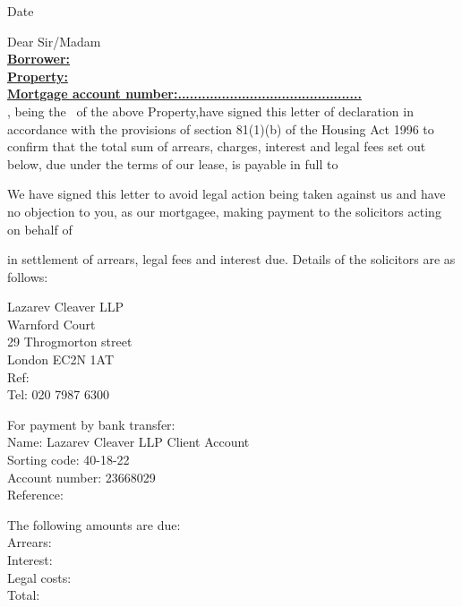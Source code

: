\documentclass{article}
\begin{document}
\noindent{\addressee} \\
\street\\
\locality\\
\town\\
\postcode\\

\noindent Date \dateset\par
\vspace{5 mm}
\noindent Dear Sir/Madam\\
\textbf{\underline{Borrower: \borrower}}\\
\noindent\textbf{\underline{Property: \property}}
\vspace{2 mm}\\
\textbf{\underline{Mortgage account number:..............................................}}\\
\weborrower, being the \lessees\ of the above Property,have signed this letter of declaration in accordance with the provisions of section 81(1)(b) of the Housing Act 1996 to confirm that the total sum of arrears, charges, interest and legal fees set out below, due under the terms of our lease, is payable in full to \address. We have signed this letter to avoid legal action being taken against
us and have no objection to you, as our mortgagee, making payment to the solicitors acting
on behalf of \address\ in settlement of arrears, legal fees and interest due. Details of the solicitors are as follows:

\begin{multicols}{2}
\noindent Lazarev Cleaver LLP\\
Warnford Court\\
29 Throgmorton street\\
London EC2N 1AT\\
Ref: \caseno\\
Tel: 020 7987 6300

\columnbreak

\noindent For payment by bank transfer:\\
Name: Lazarev Cleaver LLP Client Account\\
Sorting code: 40-18-22\\
Account number: 23668029\\
Reference: \caseno

\end{multicols}
\par
\noindent The following amounts are due:\\
\indent Arrears: \arrears\\
\indent Interest: \interest\\
\indent Legal costs: \legalcosts\\
\indent Total: \total
\end{document}
